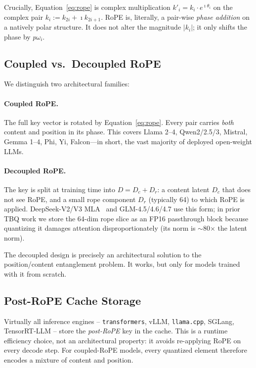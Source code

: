 \documentclass[10pt,twocolumn]{article}
\begin{document}
Crucially, Equation~\eqref{eq:rope} is complex multiplication
$k'_i = k_i\cdot e^{\imath\theta_i}$
on the complex pair $k_i\!:=\!k_{2i}+\imath k_{2i+1}$. RoPE is, literally, a pair-wise \emph{phase addition} on a natively polar structure. It does not alter the magnitude $|k_i|$; it only shifts the phase by $p\omega_i$.

\subsection{Coupled vs.\ Decoupled RoPE}

We distinguish two architectural families:

\paragraph{Coupled RoPE.}
The full key vector is rotated by Equation~\eqref{eq:rope}. Every pair carries \emph{both} content and position in its phase. This covers Llama 2--4, Qwen2/2.5/3, Mistral, Gemma 1--4, Phi, Yi, Falcon---in short, the vast majority of deployed open-weight LLMs.

\paragraph{Decoupled RoPE.}
The key is split at training time into $D = D_c + D_r$: a content latent $D_c$ that does not see RoPE, and a small rope component $D_r$ (typically 64) to which RoPE is applied. DeepSeek-V2/V3 MLA~\cite{deepseekv2} and GLM-4.5/4.6/4.7 use this form; in prior TBQ work we store the 64-dim rope slice as an FP16 passthrough block because quantizing it damages attention disproportionately (its norm is $\sim$80$\times$ the latent norm).

The decoupled design is precisely an architectural solution to the position/content entanglement problem. It works, but only for models trained with it from scratch.

\subsection{Post-RoPE Cache Storage}

Virtually all inference engines -- \texttt{transformers}, vLLM, \texttt{llama.cpp}, SGLang, TensorRT-LLM -- store the \emph{post-RoPE} key in the cache. This is a runtime efficiency choice, not an architectural property: it avoids re-applying RoPE on every decode step. For coupled-RoPE models, every quantized element therefore encodes a mixture of content and position.
\end{document}
